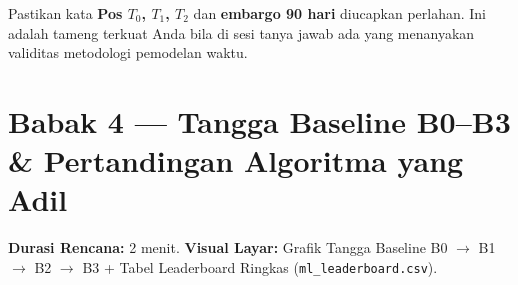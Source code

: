 \documentclass[11pt,a4paper,oneside]{book}
\newcommand{\code}[1]{{\small\nolinkurl{#1}}}
\begin{document}
\begin{tipbox}
Pastikan kata \textbf{Pos $T_0$, $T_1$, $T_2$} dan \textbf{embargo 90 hari} diucapkan perlahan. Ini adalah tameng terkuat Anda bila di sesi tanya jawab ada yang menanyakan validitas metodologi pemodelan waktu.
\end{tipbox}

\section{Babak 4 --- Tangga Baseline B0--B3 \& Pertandingan Algoritma yang Adil}

\begin{stagebox}
\textbf{Durasi Rencana:} 2 menit. \quad \textbf{Visual Layar:} Grafik Tangga Baseline B0 $\rightarrow$ B1 $\rightarrow$ B2 $\rightarrow$ B3 + Tabel Leaderboard Ringkas (\code{ml_leaderboard.csv}).
\end{stagebox}
\end{document}
